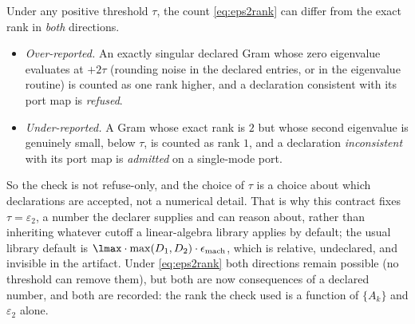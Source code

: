 
\begin{remark}\label{rem:ranktwosided}
Under any positive threshold $\tau$, the count \eqref{eq:eps2rank} can differ
from the exact rank in \emph{both} directions.
\begin{itemize}[leftmargin=1.6em]
\item \emph{Over-reported.} An exactly singular declared Gram whose zero
  eigenvalue evaluates at $+2\tau$ (rounding noise in the declared entries,
  or in the eigenvalue routine) is counted as one rank higher, and a
  declaration consistent with its port map is \emph{refused}.
\item \emph{Under-reported.} A Gram whose exact rank is $2$ but whose second
  eigenvalue is genuinely small, below $\tau$, is counted as rank $1$, and a
  declaration \emph{inconsistent} with its port map is \emph{admitted} on a
  single-mode port.
\end{itemize}
So the check is not refuse-only, and the choice of $\tau$ is a choice about
which declarations are accepted, not a numerical detail. That is why this
contract fixes $\tau=\varepsilon_2$, a number the declarer supplies and can
reason about, rather than inheriting whatever cutoff a linear-algebra library
applies by default; the usual library default is
$\lmax\cdot\max(D_1,D_2)\cdot\epsilon_{\mathrm{mach}}$, which is relative,
undeclared, and invisible in the artifact. Under \eqref{eq:eps2rank} both
directions remain possible (no threshold can remove them), but both are now
consequences of a declared number, and both are recorded: the rank the check
used is a function of $\{A_k\}$ and $\varepsilon_2$ alone.


\end{remark}
